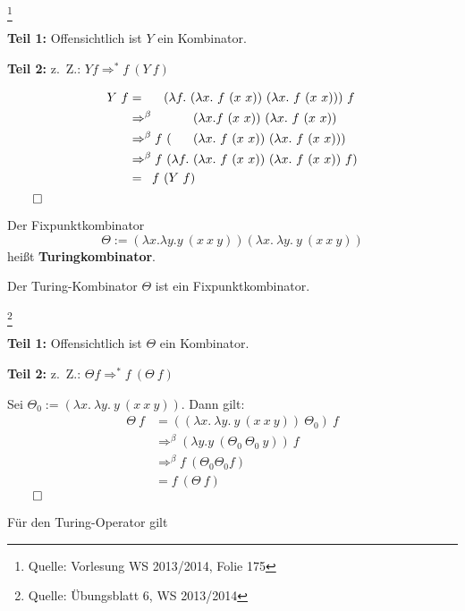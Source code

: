 \begin{beweis}\footnote{Quelle: Vorlesung WS 2013/2014, Folie 175}\leavevmode

    \textbf{Teil 1:} Offensichtlich ist $Y$ ein Kombinator.

    \textbf{Teil 2:} z.~Z.: $Y f \Rightarrow^* f \ (Y \ f)$

    \begin{align*}
        Y\ f     &=\hphantom{^\beta f\ } (\lambda f.\ (\lambda x.\ f\ (x\ x))\ (\lambda x.\ f\ (x\ x)))\ f\\
                 &\Rightarrow^\beta\hphantom{f \ (\lambda f.\ }  (\lambda x. f\ (x\ x))\ (\lambda x.\ f\ (x\ x))\\
                 &\Rightarrow^\beta  f \ (\hphantom{\lambda f.\ }(\lambda x.\ f\ (x\ x))\ (\lambda x.\ f\ (x\ x)))\\
                 &\Rightarrow^\beta  f \ (\lambda f.\ (\lambda x.\ f\ (x\ x))\ (\lambda x.\ f\ (x\ x))\ f)\\
                 &=\hphantom{^\beta} f \ (Y \ f)
    \end{align*}
    $\qed$
\end{beweis}

\begin{definition}[Turingkombinator]%
    Der Fixpunktkombinator
    \[\Theta := (\lambda x. \lambda y. y\ (x\ x\ y)) (\lambda x.\ \lambda y.\ y\ (x\ x\ y))\]
    heißt \textbf{Turingkombinator}.
\end{definition}

\begin{behauptung}
    Der Turing-Kombinator $\Theta$ ist ein Fixpunktkombinator.
\end{behauptung}

\begin{beweis}\footnote{Quelle: Übungsblatt 6, WS 2013/2014}

    \textbf{Teil 1:} Offensichtlich ist $\Theta$ ein Kombinator.

    \textbf{Teil 2:} z.~Z.: $\Theta f \Rightarrow^* f \ (\Theta \ f)$

    Sei $\Theta_0 := (\lambda x.\ \lambda y.\ y\ (x\ x\ y))$. Dann gilt:
    \begin{align*}
        \Theta\ f &= ((\lambda x.\ \lambda y.\ y\ (x\ x\ y))\ \Theta_0)\ f\\
                 &\Rightarrow^\beta (\lambda y. y\ (\Theta_0 \ \Theta_0 \ y))\ f\\
                 &\Rightarrow^\beta f \ (\Theta_0 \Theta_0 f)\\
                 &= f \ (\Theta \ f)
    \end{align*}
    $\qed$
\end{beweis}



Für den Turing-Operator gilt 